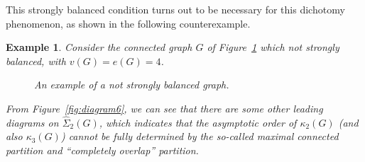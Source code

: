 \documentclass[12pt]{article}
\newtheorem{example}[prop]{Example}
\numberwithin{equation}{section}
\begin{document}
 This strongly balanced condition turns out to be necessary for this dichotomy phenomenon, as shown in the following counterexample. 
\begin{example}
  Consider the connected graph $G$ of Figure~\ref{fig:diagram5}
  which not strongly balanced, with $v(G)=e(G)=4$. 
\begin{figure}[H]
\captionsetup[subfigure]{font=footnotesize}
\centering
{}%
\caption{An example of a not strongly balanced graph.}\label{fig:diagram5} 
\end{figure}

\vskip-0.5cm

  \noindent
  From Figure~\ref{fig:diagram6}, we can see that there are some other leading diagrams on
 $\widehat{\Sigma}_2(G)$, which indicates that the asymptotic order of $\kappa_2(G)$ (and also $\kappa_3(G)$) cannot be fully determined by the so-called maximal connected partition and ``completely overlap'' partition.  


\end{example}
\end{document}
